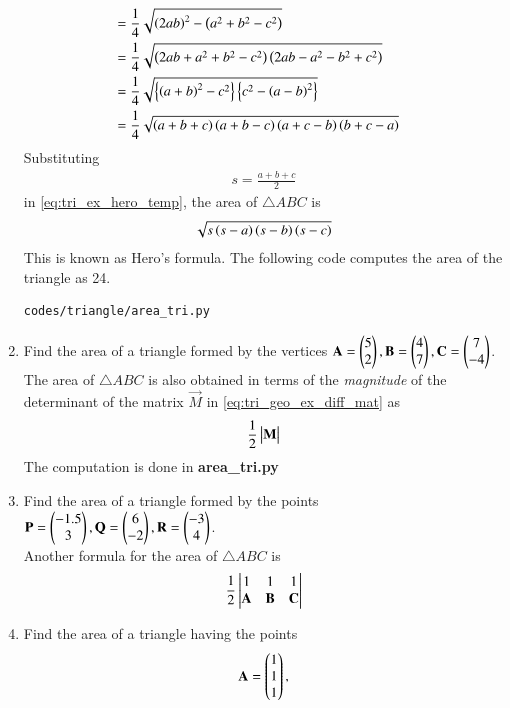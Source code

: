 \begin{enumerate}[label=\arabic*.,ref=\thesubsection.\theenumi]
{\begin{align}
{}
\\
&=\frac{1}{4}\sqrt{\left(2ab\right)^2-\left(a^2+b^2-c^2\right)}
\\
&=\frac{1}{4}\sqrt{\left(2ab+a^2+b^2-c^2\right)\left(2ab-a^2-b^2+c^2\right)}
\\
&= \frac{1}{4}\sqrt{\left\{\left(a+b\right)^2-c^2\right\}\left\{c^2-\left(a-b\right)^2\right\}}
\\
&= \frac{1}{4}\sqrt{\left(a+b+c\right)\left(a+b-c\right)\left(a+c-b\right)\left(b+c-a\right)}
\label{eq:tri_ex_hero_temp}
\end{align}
}
Substituting 
%
\begin{align}
s=\frac{a+b+c}{2}
\end{align}
%
in \eqref{eq:tri_ex_hero_temp}, the area of $\triangle ABC$ is 
%
\begin{align}
\sqrt{s\left(s-a\right)\left(s-b\right)\left(s-c\right)}
\end{align}
%
This is known as Hero's formula.  The following code computes the area of the  triangle as 24.
%
\begin{lstlisting}
codes/triangle/area_tri.py
\end{lstlisting}
%
%
\item Find the area of a triangle formed by the vertices $\mathbf{A}=\begin{pmatrix}5\\2\end{pmatrix}, \mathbf{B}=\begin{pmatrix}4\\7\end{pmatrix}, \mathbf{C}=\begin{pmatrix}7\\-4\end{pmatrix}$.
\\
\solution  The area of $\triangle ABC$ is also obtained  in terms of the  {\em magnitude} of the determinant of the matrix $\vec{M}$ in  \eqref{eq:tri_geo_ex_diff_mat} as
%
\begin{align}
\frac{1}{2}\begin{vmatrix}\mathbf{M}\end{vmatrix}
\end{align}
The computation is done in \textbf{area\_tri.py}
\item Find the area of a triangle formed by the points $\mathbf{P}=\begin{pmatrix}-1.5\\3\end{pmatrix}, \mathbf{Q}=\begin{pmatrix}6\\-2\end{pmatrix}, \mathbf{R}=\begin{pmatrix}-3\\4\end{pmatrix}$.
\\
\solution Another formula for the area of $\triangle ABC$  is
%
\begin{align}
\frac{1}{2}\begin{vmatrix}1 & 1 & 1\\ \mathbf{A} & \mathbf{B} & \mathbf{C} \end{vmatrix}
\end{align}
%
\item Find the area of a triangle having the points
%
\begin{align}
\vec{A} = \myvec{1\\1 \\1},

\end{align}
\end{enumerate}
